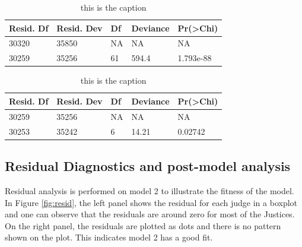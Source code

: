 \documentclass{monashthesis}
\begin{document}
\begin{table}[ht]
\begin{center}
\caption{\label{tab:anova-1}this is the caption}
\begin{tabular}{lllll}
\toprule
Resid. Df & Resid. Dev & Df & Deviance & Pr(>Chi) \\
\midrule
30320 & 35850 & NA &    NA &        NA \\
30259 & 35256 & 61 & 594.4 & 1.793e-88 \\
\bottomrule
\end{tabular}
\end{center}
\end{table}

\begin{table}[ht]
\begin{center}
\caption{\label{tab:anova-2}this is the caption}
\begin{tabular}{lllll}
\toprule
Resid. Df & Resid. Dev & Df & Deviance & Pr(>Chi) \\
\midrule
30259 & 35256 & NA &    NA &      NA \\
30253 & 35242 &  6 & 14.21 & 0.02742 \\
\bottomrule
\end{tabular}
\end{center}
\end{table}

\hypertarget{residual-diagnostics-and-post-model-analysis}{%
\subsection{Residual Diagnostics and post-model analysis}\label{residual-diagnostics-and-post-model-analysis}}

Residual analysis is performed on model 2 to illustrate the fitness of the model. In Figure \ref{fig:resid}, the left panel shows the residual for each judge in a boxplot and one can observe that the residuals are around zero for most of the Justices. On the right panel, the residuals are plotted as dots and there is no pattern shown on the plot. This indicates model 2 has a good fit.
\end{document}
